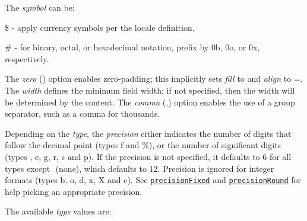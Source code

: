 The {\itshape symbol} can be\+:


\begin{DoxyItemize}
\item {\ttfamily \$} -\/ apply currency symbols per the locale definition.
\item {\ttfamily \#} -\/ for binary, octal, or hexadecimal notation, prefix by {\ttfamily 0b}, {\ttfamily 0o}, or {\ttfamily 0x}, respectively.
\end{DoxyItemize}

The {\itshape zero} ({}) option enables zero-\/padding; this implicitly sets {\itshape fill} to {} and {\itshape align} to {\ttfamily =}. The {\itshape width} defines the minimum field width; if not specified, then the width will be determined by the content. The {\itshape comma} ({\ttfamily ,}) option enables the use of a group separator, such as a comma for thousands.

Depending on the {\itshape type}, the {\itshape precision} either indicates the number of digits that follow the decimal point (types {\ttfamily f} and {\ttfamily \%}), or the number of significant digits (types {\ttfamily ​}, {\ttfamily e}, {\ttfamily g}, {\ttfamily r}, {\ttfamily s} and {\ttfamily p}). If the precision is not specified, it defaults to 6 for all types except {\ttfamily ​} (none), which defaults to 12. Precision is ignored for integer formats (types {\ttfamily b}, {\ttfamily o}, {\ttfamily d}, {\ttfamily x}, {\ttfamily X} and {\ttfamily c}). See \href{#precisionFixed}{\tt precision\+Fixed} and \href{#precisionRound}{\tt precision\+Round} for help picking an appropriate precision.

The available {\itshape type} values are\+:


